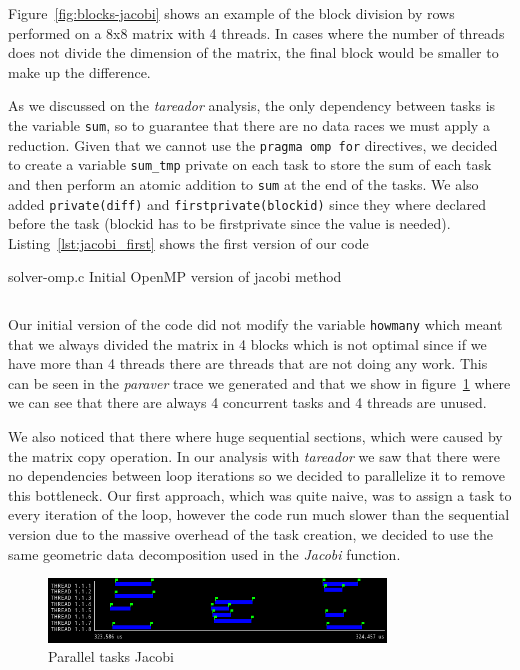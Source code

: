 Figure~\ref{fig:blocks-jacobi} shows an example of the block division by rows performed on a 8x8 matrix
with 4 threads. In cases where the number of threads does not divide the dimension of the matrix, the final
block would be smaller to make up the difference.

As we discussed on the \emph{tareador} analysis, the only dependency between tasks is the variable
\texttt{sum}, so to guarantee that there are no data races we must apply a reduction. Given that we cannot use
the \texttt{pragma omp for} directives, we decided to create a variable \texttt{sum\_tmp} private on each
task to store the sum of each task and then perform an atomic addition to \texttt{sum} at the end of the tasks.
We also added \texttt{private(diff)} and \texttt{firstprivate(blockid)} since they where declared before the
task (blockid has to be firstprivate since the value is needed).
Listing~\ref{lst:jacobi_first} shows the first version of our code 

\begin{listing}[H]
    \caption{solver-omp.c Initial OpenMP version of jacobi method}%
    \label{lst:jacobi_first}
    \inputminted[firstline=26,lastline=55]{c}{code/solver-omp-jacobi-v1.c}
\end{listing}

Our initial version of the code did not modify the variable \texttt{howmany} which meant that we always
divided the matrix in 4 blocks which is not optimal since if we have more than 4 threads there are threads
that are not doing any work. This can be seen in the \emph{paraver} trace we generated and that we show in
figure~\ref{fig:trace-jacobi0} where we can see that there are always 4 concurrent tasks and 4 threads are unused.

We also noticed that there where huge sequential sections, which were caused by the matrix copy operation.
In our analysis with \emph{tareador} we saw that there were no dependencies between loop iterations so
we decided to parallelize it to remove this bottleneck. Our first approach, which was quite naive, was to
assign a task to every iteration of the loop, however the code run much slower than the sequential
version due to the massive overhead of the task creation, we decided to use the same geometric data
decomposition used in the \emph{Jacobi} function.

\begin{figure}[H]
    \centering
    \includegraphics[width=0.8\textwidth]{jacobi_0_tasks}
    \caption{Parallel tasks Jacobi}%
    \label{fig:trace-jacobi0}
\end{figure}

